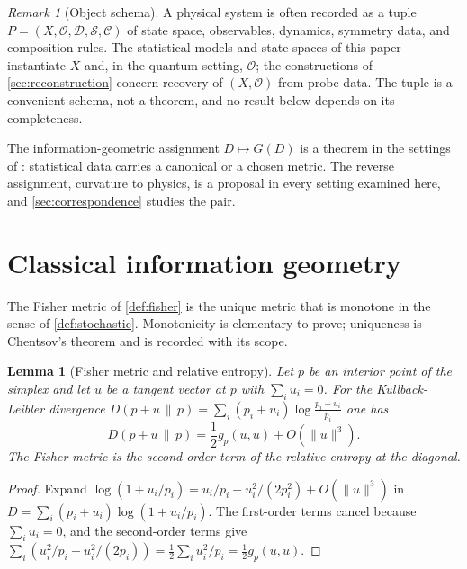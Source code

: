 \documentclass[11pt,letterpaper]{article}
\newtheorem{lemma}[theorem]{Lemma}
\theoremstyle{definition}
\theoremstyle{remark}
\newtheorem{remark}[theorem]{Remark}
\begin{document}
\begin{remark}[Object schema]
\label{rem:schema}
A physical system is often recorded as a tuple $P = (X, \mathcal{O}, \mathcal{D}, \mathcal{S}, \mathcal{C})$ of state space, observables, dynamics, symmetry data, and composition rules. The statistical models and state spaces of this paper instantiate $X$ and, in the quantum setting, $\mathcal{O}$; the constructions of \cref{sec:reconstruction} concern recovery of $(X, \mathcal{O})$ from probe data. The tuple is a convenient schema, not a theorem, and no result below depends on its completeness.
\end{remark}

The information-geometric assignment $D \mapsto G(D)$ is a theorem in the settings of : statistical data carries a canonical or a chosen metric. The reverse assignment, curvature to physics, is a proposal in every setting examined here, and \cref{sec:correspondence} studies the pair.

\section{Classical information geometry}
\label{sec:classical}

The Fisher metric of \cref{def:fisher} is the unique metric that is monotone in the sense of \cref{def:stochastic}. Monotonicity is elementary to prove; uniqueness is Chentsov's theorem and is recorded with its scope.

\begin{lemma}[Fisher metric and relative entropy]
\label{lem:kl}
Let $p$ be an interior point of the simplex and let $u$ be a tangent vector at $p$ with $\sum_i u_i = 0$. For the Kullback-Leibler divergence $D(p + u \,\|\, p) = \sum_i (p_i + u_i) \log \frac{p_i + u_i}{p_i}$ one has
\begin{equation}
D(p + u \,\|\, p) = \frac{1}{2} g_p(u, u) + O(\|u\|^3).
\end{equation}
The Fisher metric is the second-order term of the relative entropy at the diagonal.
\end{lemma}

\begin{proof}
Expand $\log(1 + u_i/p_i) = u_i/p_i - u_i^2 / (2 p_i^2) + O(\|u\|^3)$ in
$D = \sum_i (p_i + u_i) \log(1 + u_i/p_i)$. The first-order terms cancel because $\sum_i u_i = 0$, and the second-order terms give $\sum_i (u_i^2/p_i - u_i^2 / (2 p_i)) = \frac{1}{2} \sum_i u_i^2 / p_i = \frac{1}{2} g_p(u, u)$.
\end{proof}
\end{document}
